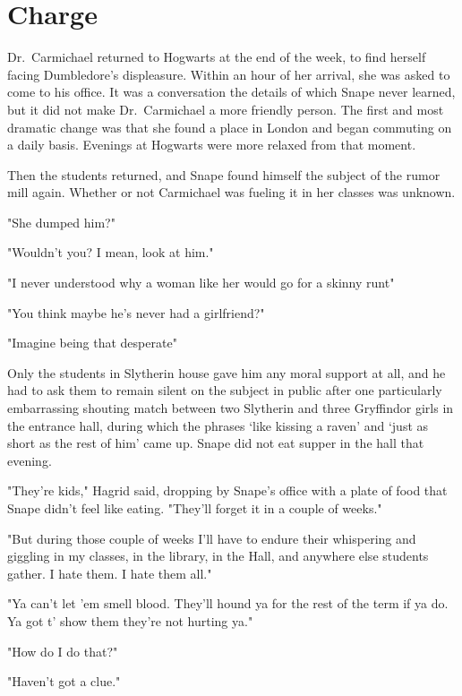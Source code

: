 
\chapter{Charge}

Dr.~Carmichael returned to Hogwarts at the end of the week, to find herself facing Dumbledore's displeasure. Within an hour of her arrival, she was asked to come to his office. It was a conversation the details of which Snape never learned, but it did not make Dr.~Carmichael a more friendly person. The first and most dramatic change was that she found a place in London and began commuting on a daily basis. Evenings at Hogwarts were more relaxed from that moment.

Then the students returned, and Snape found himself the subject of the rumor mill again. Whether or not Carmichael was fueling it in her classes was unknown.

"She dumped him?"

"Wouldn't you? I mean, look at him."

"I never understood why a woman like her would go for a skinny runt{\el}"

"You think maybe he's never had a girlfriend?"

"Imagine being that desperate{\el}"

Only the students in Slytherin house gave him any moral support at all, and he had to ask them to remain silent on the subject in public after one particularly embarrassing shouting match between two Slytherin and three Gryffindor girls in the entrance hall, during which the phrases `like kissing a raven' and `just as short as the rest of him' came up. Snape did not eat supper in the hall that evening.

"They're kids," Hagrid said, dropping by Snape's office with a plate of food that Snape didn't feel like eating. "They'll forget it in a couple of weeks."

"But during those couple of weeks I'll have to endure their whispering and giggling in my classes, in the library, in the Hall, and anywhere else students gather. I hate them. I hate them all."

"Ya can't let 'em smell blood. They'll hound ya for the rest of the term if ya do. Ya got t' show them they're not hurting ya."

"How do I do that?"

"Haven't got a clue."

